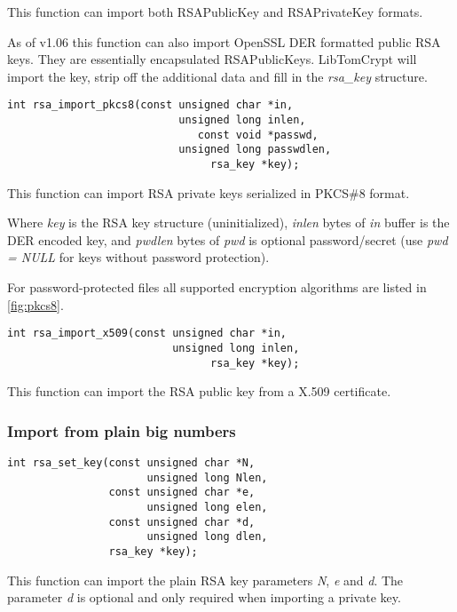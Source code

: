 \documentclass[synpaper]{book}
\begin{document}
This function can import both RSAPublicKey and RSAPrivateKey formats.

As of v1.06 this function can also import OpenSSL DER formatted public RSA keys.  They are essentially encapsulated RSAPublicKeys.  LibTomCrypt will
import the key, strip off the additional data and fill in the \textit{rsa\_key} structure.

\begin{verbatim}
int rsa_import_pkcs8(const unsigned char *in,
                           unsigned long inlen,
                              const void *passwd,
                           unsigned long passwdlen,
                                rsa_key *key);
\end{verbatim}

This function can import RSA private keys serialized in PKCS\#8 format.

Where \textit{key} is the RSA key structure (uninitialized), \textit{inlen} bytes of \textit{in} buffer is the DER encoded key,
and \textit{pwdlen} bytes of \textit{pwd} is optional password/secret (use \textit{pwd = NULL} for keys without password protection).

For password-protected files all supported encryption algorithms are listed in \ref{fig:pkcs8}.

\begin{verbatim}
int rsa_import_x509(const unsigned char *in,
                          unsigned long inlen,
                                rsa_key *key);
\end{verbatim}

This function can import the RSA public key from a X.509 certificate.

\subsubsection{Import from plain big numbers}

\begin{verbatim}
int rsa_set_key(const unsigned char *N,
                      unsigned long Nlen,
                const unsigned char *e,
                      unsigned long elen,
                const unsigned char *d,
                      unsigned long dlen,
                rsa_key *key);
\end{verbatim}

This function can import the plain RSA key parameters \textit{N}, \textit{e} and \textit{d}.
The parameter \textit{d} is optional and only required when importing a private key.
\end{document}
